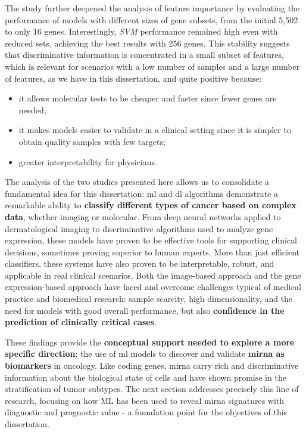 The study further deepened the analysis of feature importance by evaluating the
performance of models with different sizes of gene subsets, from the initial
5,502 to only 16 genes. Interestingly, \textit{SVM} performance remained high
even with reduced sets, achieving the best results with 256 genes. This
stability suggests that discriminative information is concentrated in a small
subset of features, which is relevant for scenarios with a low number of
samples and a large number of features, as we have in this dissertation, and
quite positive because:

\begin{itemize}
  \item it allows molecular tests to be cheaper and faster since fewer genes are
        needed;
  \item it makes models easier to validate in a clinical setting since it is simpler to
        obtain quality samples with few targets;
  \item greater interpretability for physicians.
\end{itemize}

The analysis of the two studies presented here allows us to consolidate a
fundamental idea for this dissertation: \gls{ml} and \gls{dl} algorithms
demonstrate a remarkable ability to \textbf{classify different types of cancer
  based on complex data}, whether imaging or molecular. From deep neural networks
applied to dermatological imaging to discriminative algorithms used to analyze
gene expression, these models have proven to be effective tools for supporting
clinical decisions, sometimes proving superior to human experts. More than just
efficient classifiers, these systems have also proven to be interpretable,
robust, and applicable in real clinical scenarios. Both the image-based
approach \cite{ai_in_dermacancer_esteva2017} and the gene expression-based
approach \cite{bca_subtypes_with_ml_Wu_2021} have faced and overcome challenges
typical of medical practice and biomedical research: sample scarcity, high
dimensionality, and the need for models with good overall performance, but also
\textbf{confidence in the prediction of clinically critical cases}.

These findings provide the \textbf{conceptual support needed to explore a more
  specific direction}: the use of \gls{ml} models to discover and validate
\textbf{\gls{mirna} as biomarkers} in oncology. Like coding genes, \gls{mirna}
carry rich and discriminative information about the biological state of cells
and have shown promise in the stratification of tumor subtypes. The next
section addresses precisely this line of research, focusing on how ML has been
used to reveal \gls{mirna} signatures with diagnostic and prognostic value - a
foundation point for the objectives of this dissertation.


